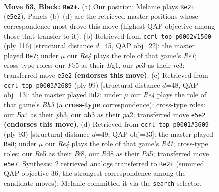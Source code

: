 \documentclass[11pt]{article}
\begin{document}
\clearpage

\begin{figure}[p]\centering
\begin{subfigure}{0.46\textwidth}\centering
\resizebox{\linewidth}{!}{%
\newchessgame
\chessboard[
  setfen={3r4/6k1/1p6/p1p1r3/b1N5/2P3PN/K4p1P/7R b - - 3 53},
  showmover=false,
  pgfstyle=straightmove, color=movearrow, markmove={e5-e2}
]}
\caption{}
\end{subfigure}\hfill
\begin{subfigure}{0.46\textwidth}\centering
\resizebox{\linewidth}{!}{%
\newchessgame
\chessboard[
  setfen={8/6N1/2p3k1/8/2p3pP/2rn1pP1/5P2/4R1BK w - - 3 59},
  showmover=false,
  pgfstyle=straightmove, color=movearrow, markmove={e1-e7}
]}
\caption{}
\end{subfigure}
\\[4pt]
\begin{subfigure}{0.46\textwidth}\centering
\resizebox{\linewidth}{!}{%
\newchessgame
\chessboard[
  setfen={1r3k2/4pp2/3p3b/1p3N1P/pP2R3/7P/P4K2/8 b - - 0 50},
  showmover=false,
  pgfstyle=straightmove, color=movearrow, markmove={h6-d2}
]}
\caption{}
\end{subfigure}\hfill
\begin{subfigure}{0.46\textwidth}\centering
\resizebox{\linewidth}{!}{%
\newchessgame
\chessboard[
  setfen={3r1b2/6pk/4N2p/p3pP2/6P1/5K1P/2R5/8 b - - 7 47},
  showmover=false,
  pgfstyle=straightmove, color=movearrow, markmove={d8-a8}
]}
\caption{}
\end{subfigure}
\caption{\textbf{Move 53, Black: \texttt{Re2+}.} (a) Our position; Melanie plays \texttt{Re2+} (\texttt{e5e2}). Panels (b)--(d) are the retrieved master positions whose correspondence most drove this move (highest QAP objective among those that transfer to it). (b) Retrieved from \texttt{ccrl\_top\_p0002\#1500} (ply 116) [structural distance $d$=45, QAP obj=22]: the master played \texttt{Re7}; under $\mu$ our \emph{Re4} plays the role of that game's \emph{Re1}; cross-type roles: our \emph{P}c5 as their \emph{B}g1, our \emph{p}c3 as their \emph{r}c3; transferred move \texttt{e5e2} \textbf{(endorses this move)}. (c) Retrieved from \texttt{ccrl\_top\_p0003\#2689} (ply 99) [structural distance $d$=48, QAP obj=13]: the master played \texttt{Bd2}; under $\mu$ our \emph{Re4} plays the role of that game's \emph{Bh3} (a \textbf{cross-type} correspondence); cross-type roles: our \emph{B}a4 as their \emph{p}h3, our \emph{n}h3 as their \emph{p}a2; transferred move \texttt{e5e2} \textbf{(endorses this move)}. (d) Retrieved from \texttt{ccrl\_top\_p0001\#3609} (ply 93) [structural distance $d$=49, QAP obj=33]: the master played \texttt{Ra8}; under $\mu$ our \emph{Re4} plays the role of that game's \emph{Rd1}; cross-type roles: our \emph{R}e5 as their \emph{B}f8, our \emph{R}d8 as their \emph{P}a5; transferred move \texttt{e5e7}. Synthesis: 2 retrieved analogs transferred to \texttt{Re2+} (summed QAP objective 36, the strongest correspondence among the candidate moves); Melanie committed it via the \texttt{search} selector.}
\label{fig:thought-m105}
\end{figure}
\end{document}
